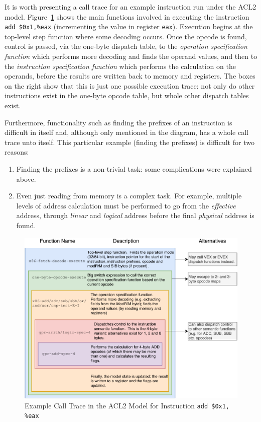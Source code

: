 \documentclass[a4paper,12pt,twoside,openright]{report}
\begin{document}
It is worth presenting a call trace for an example instruction run under the ACL2 model.  Figure~\ref{diagram-trace} shows the main functions involved in executing the instruction \texttt{add \$0x1,\%eax} (incrementing the value in register \texttt{eax}).  Execution begins at the top-level step function where some decoding occurs.  Once the opcode is found, control is passed, via the one-byte dispatch table, to the \emph{operation specification function} which performs more decoding and finds the operand values, and then to the \emph{instruction specification function} which performs the calculation on the operands, before the results are written back to memory and registers.  The boxes on the right show that this is just one possible execution trace: not only do other instructions exist in the one-byte opcode table, but whole other dispatch tables exist.

Furthermore, functionality such as finding the prefixes of an instruction is difficult in itself and, although only mentioned in the diagram, has a whole call trace unto itself.  This particular example (finding the prefixes) is difficult for two reasons:

\begin{enumerate}
  \item Finding the prefixes is a non-trivial task: some complications were explained above.
  \item Even just reading from memory is a complex task.  For example, multiple levels of address calculation must be performed to go from the \emph{effective} address, through \emph{linear} and \emph{logical} address before the final \emph{physical} address is found.
\end{enumerate}

\begin{figure}
\centering

  \includegraphics[width=\columnwidth]{../diagrams/trace.pdf}

\caption{Example Call Trace in the ACL2 Model for Instruction \texttt{add \$0x1, \%eax}}
\label{diagram-trace}
\end{figure}
\end{document}
